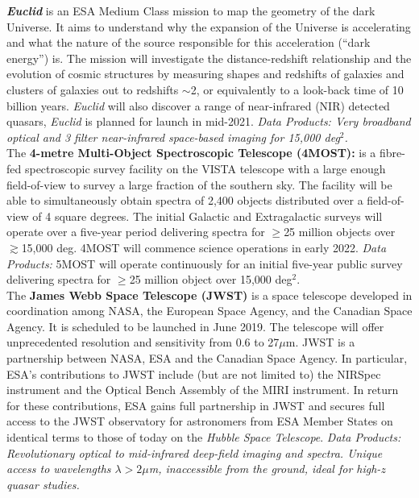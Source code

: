 \begin{framed}
\textit{\textbf{Euclid}} is an ESA Medium Class mission to map the
geometry of the dark Universe.  It aims to understand why the
expansion of the Universe is accelerating and what the nature of the
source responsible for this acceleration (``dark energy'') is.  The
mission will investigate the distance-redshift relationship and the
evolution of cosmic structures by measuring shapes and redshifts of
galaxies and clusters of galaxies out to redshifts $\sim$2, or
equivalently to a look-back time of 10 billion years. {\it Euclid} will 
also discover a range of near-infrared (NIR) detected quasars,  
 {\it Euclid} is planned for launch in mid-2021.  {\it Data Products: Very broadband
optical and 3 filter near-infrared space-based imaging for 15,000
deg$^2$.} \\

The {\bf 4-metre Multi-Object Spectroscopic Telescope (4MOST):} is a
fibre-fed spectroscopic survey facility on the VISTA telescope with a
large enough field-of-view to survey a large fraction of the southern
sky. The facility will be able to simultaneously obtain spectra of
2,400 objects distributed over a field-of-view of 4 square degrees.
The initial Galactic and Extragalactic surveys will operate over a
five-year period delivering spectra for $\geq$25 million objects over
$\gtrsim$15,000 deg. 4MOST will commence science operations in early
2022. {\it Data Products: } 5MOST will operate continuously for an
initial five-year public survey delivering spectra for $\geq$25
million object over 15,000 deg$^{2}$.\\

The {\bf James Webb Space Telescope (JWST)} is a space telescope
developed in coordination among NASA, the European Space Agency, and
the Canadian Space Agency. It is scheduled to be launched in June
2019. The telescope will offer unprecedented resolution and
sensitivity from 0.6 to 27$\mu$m. JWST is a partnership between NASA,
ESA and the Canadian Space Agency.  In particular, ESA's contributions
to JWST include (but are not limited to) the NIRSpec instrument and
the Optical Bench Assembly of the MIRI instrument.  In return for
these contributions, ESA gains full partnership in JWST and secures
full access to the JWST observatory for astronomers from ESA Member
States on identical terms to those of today on the {\it Hubble Space
Telescope}. {\it Data Products: Revolutionary optical to mid-infrared
deep-field imaging and spectra.  Unique access to wavelengths
$\lambda>2\mu$m, inaccessible from the ground, ideal for high-$z$
quasar studies.} \\



\end{framed}
